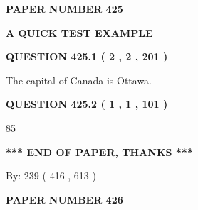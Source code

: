 \documentclass[12pt]{article}
\begin{document}
   
   
   
\newpage 
\setcounter{page}{ 
   425001 } 
   
   
   
   
 {\textbf{ \Large{ PAPER NUMBER  425  }}}
   
   
\vspace{0.2in}
   
   
   
   
   
   
 \vspace{0.2in}
{\LARGE {\textbf{ A QUICK TEST EXAMPLE}}}
   
   
  
\vspace{0.2in}
  
{\textbf{\Large{QUESTION
425.1 
 ( 2 , 2 , 201 )
}}}
  
  
 
 
\noindent{}
 
 
The capital of Canada is Ottawa.
 
 
 
 
  
\vspace{0.2in}
  
{\textbf{\Large{QUESTION
425.2 
 ( 1 , 1 , 101 )
}}}
  
  
 
 
\noindent{}

85
 
 
   
   
 \vspace{0.2in}
 
   
   
   
   
\vspace{1.0in} 
{\textbf{\large{ *** END OF PAPER, THANKS *** }}} 
   
   
\hspace{1.0in} By: 
 239 ( 416 ,  613 )
   
   
   
   
\newpage 
\setcounter{page}{ 
   426001 } 
   
   
   
   
 {\textbf{ \Large{ PAPER NUMBER  426  }}}
   
\end{document}
